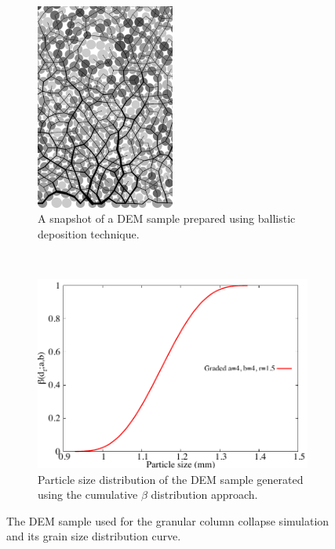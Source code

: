 \begin{figure}[tbhp]
\centering
\begin{subfigure}[b]{0.95\textwidth}
\centering
\includegraphics[width=0.5\textwidth]{a4b4r18}
\caption{A snapshot of a DEM sample prepared using ballistic deposition 
technique.}
\label{fig:a4b4r18}
\end{subfigure}
\\
\begin{subfigure}[b]{0.95\textwidth}
\centering
\includegraphics[width=\textwidth]{PSD}
\caption{Particle size distribution of the DEM sample generated using the 
cumulative $\beta$ distribution approach.}
\label{fig:PSD}
\end{subfigure}
\caption{The DEM sample used for the granular column collapse simulation and 
its grain size distribution curve.}
\label{fig:DEM_Sample}
\end{figure}


